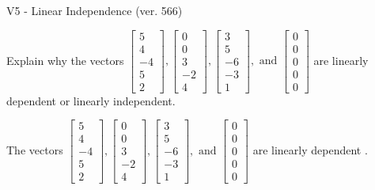 \begin{exercise}
  \begin{exerciseTitle}V5 - Linear Independence (ver. 566)\end{exerciseTitle}
  \begin{exerciseStatement}
    Explain why the vectors \(\left[\begin{array}{r}
5 \\
4 \\
-4 \\
5 \\
2
\end{array}\right] , \left[\begin{array}{r}
0 \\
0 \\
3 \\
-2 \\
4
\end{array}\right] , \left[\begin{array}{r}
3 \\
5 \\
-6 \\
-3 \\
1
\end{array}\right] , \text{ and } \left[\begin{array}{r}
0 \\
0 \\
0 \\
0 \\
0
\end{array}\right]\) are linearly dependent or linearly independent.	


  \end{exerciseStatement}
  \begin{exerciseAnswer}
   The vectors \(\left[\begin{array}{r}
5 \\
4 \\
-4 \\
5 \\
2
\end{array}\right] , \left[\begin{array}{r}
0 \\
0 \\
3 \\
-2 \\
4
\end{array}\right] , \left[\begin{array}{r}
3 \\
5 \\
-6 \\
-3 \\
1
\end{array}\right] , \text{ and } \left[\begin{array}{r}
0 \\
0 \\
0 \\
0 \\
0
\end{array}\right]\) are 
  	 linearly dependent  .
  


  \end{exerciseAnswer}
\end{exercise}
